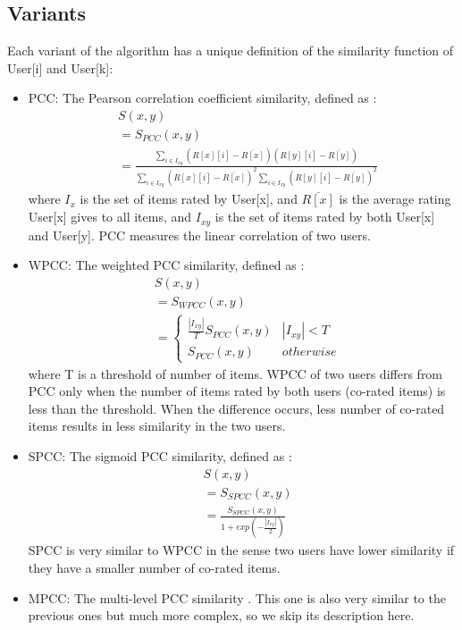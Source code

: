 \documentclass[letterpaper]{article}
\begin{document}
\subsection{Variants}
Each variant of the algorithm has a unique definition of the similarity 
function of User[i] and User[k]:
\begin{itemize}
	\item PCC: The Pearson correlation coefficient similarity, defined as 
	\citeauthor{resnick1994grouplens}:
	\begin{align*}
		&S(x, y) \\
		&= S_{PCC}(x, y) \\
		&= \frac{\sum_{i \in I_{xy}}(R[x][i] - \overline{R[x]})(R[y][i] - 
		\overline{R[y]})}{\sum_{i \in I_{xy}}(R[x][i] - \overline{R[x]})^2 
		\sum_{i 
		\in I_{xy}}(R[y][i] - \overline{R[y]})^2 }
	\end{align*}
	where $ I_{x} $ is the set of items rated by User[x],
	and	$ \overline{R[x]} $ is the average rating User[x] gives to all items,
	and $ I_{xy} $ is the set of items rated by both User[x] and User[y].
	PCC measures the linear correlation of two users.
	\item WPCC: The weighted PCC similarity, defined as 
	\citeauthor{herlocker1999algorithmic}:
	\begin{align*}
		&S(x, y) \\
		&= S_{WPCC}(x, y) \\
		&= 
		\begin{cases}
			\frac{|I_{xy}|}{T} S_{PCC}(x, y) & |I_{xy}| < T \\
			S_{PCC}(x, y) & otherwise
		\end{cases}
	\end{align*}
	where T is a threshold of number of items. 
	WPCC of two users differs from PCC only when the number of items rated by 
	both users (co-rated items) is less than the threshold. 
	When the difference occurs, less number of co-rated items results in less 
	similarity in the two users.
	\item SPCC: The sigmoid PCC similarity, defined as 
	\citeauthor{jamali2009trustwalker}:
	\begin{align*}
		&S(x, y) \\
		&= S_{SPCC} (x, y) \\
		&= \frac{S_{SPCC}(x, y)}{1 + exp(-\frac{|I_{xy}|}{2})}
	\end{align*}
	SPCC is very similar to WPCC in the sense two users have lower similarity 
	if they have a smaller number of co-rated items.
	\item MPCC: The multi-level PCC similarity \citeauthor{polatidis2016multi}. 
	This one is also very similar to the previous ones but much more complex, 
	so we skip its description here.
\end{itemize}
\end{document}

